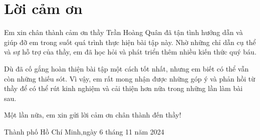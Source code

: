 \section*{Lời cảm ơn}
Em xin chân thành cảm ơn thầy Trần Hoàng Quân đã tận tình hướng dẫn và giúp đỡ em trong suốt quá trình thực hiện bài tập này. Nhờ những chỉ dẫn cụ thể và sự hỗ trợ của thầy, em đã học hỏi và phát triển thêm nhiều kiến thức quý báu.

Dù đã cố gắng hoàn thiện bài tập một cách tốt nhất, nhưng em biết có thể vẫn còn những thiếu sót. Vì vậy, em rất mong nhận được những góp ý và phản hồi từ thầy để có thể rút kinh nghiệm và cải thiện hơn nữa trong những lần làm bài sau. 

Một lần nữa, em xin gửi lời cảm ơn chân thành đến thầy!

\begin{flushright}
Thành phố Hồ Chí Minh,ngày 6 tháng 11 năm 2024
\end{flushright}